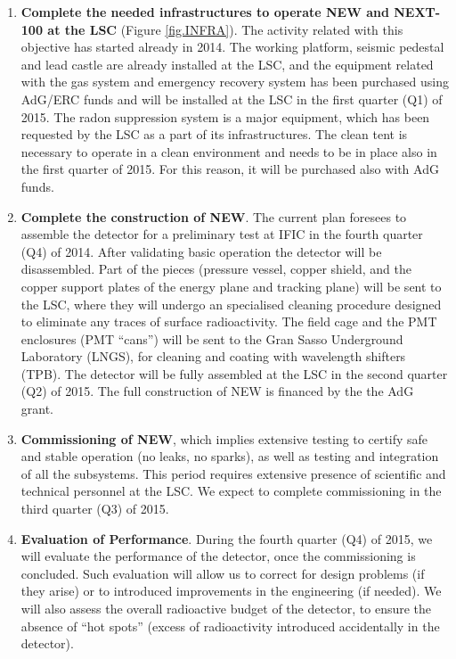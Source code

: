 \begin{enumerate}
\item {\bf Complete the needed infrastructures to operate NEW and NEXT-100 at the LSC} (Figure \ref{fig.INFRA}). The activity related with this objective has started already in 2014. The working platform, seismic pedestal and lead castle are already installed at the LSC, and the equipment related with the gas system and emergency recovery system has been purchased using AdG/ERC funds and will be installed at the LSC in the first quarter (Q1) of 2015. The radon suppression system is a major equipment, which has been requested by the LSC as a part of its infrastructures. The clean tent is necessary to operate in a clean environment and needs to be in place also in the first quarter of 2015. For this reason, it will be purchased also with AdG funds. 

\item {\bf Complete the construction of NEW}. The current plan foresees to assemble the detector for a preliminary test at IFIC in the fourth quarter (Q4) of 2014. After validating basic operation the detector will be disassembled. Part of the pieces (pressure vessel, copper shield, and the copper support plates of the energy plane and tracking plane) will be sent to the LSC, where they will undergo an specialised cleaning procedure designed to eliminate any traces of surface radioactivity. The field cage and the PMT enclosures (PMT ``cans'') will be sent to the Gran Sasso Underground Laboratory (LNGS), for cleaning and coating with wavelength shifters (TPB). The detector will be fully assembled at the LSC in the second quarter (Q2) of 2015. The full construction of NEW is financed by the the AdG grant. 
 
\item {\bf Commissioning of NEW}, which implies extensive testing to certify safe and stable operation (no leaks, no sparks), as well as testing and integration of all the subsystems. This period requires extensive presence of scientific and technical personnel at the LSC. We expect to complete commissioning in the third quarter (Q3) of 2015.

\item {\bf Evaluation of Performance}. During the fourth quarter (Q4) of 2015, we will evaluate the performance of the detector, once the commissioning is concluded. Such evaluation will allow us to correct for design problems (if they arise) or to introduced improvements in the engineering (if needed). We will also assess the overall radioactive budget of the detector, to ensure the absence of ``hot spots'' (excess of radioactivity introduced accidentally in the detector). 


\end{enumerate}
